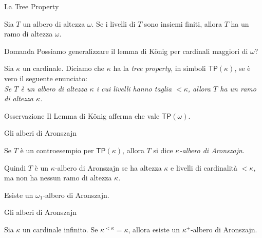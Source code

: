 \documentclass{beamer}
\theoremstyle{num.custom-title}
\theoremstyle{custom-title}
\newcommand{\TP}{\ensuremath{\mathsf{TP}}\xspace}
\begin{document}
\begin{frame}{La Tree Property}

\vspace{5pt}

\begin{lemma}[König]
Sia $T$ un albero di altezza $\omega$. Se i livelli di $T$ sono insiemi finiti, allora $T$ ha un ramo di altezza $\omega$.
\end{lemma}

\begin{exampleblock}{Domanda}
Possiamo generalizzare il lemma di König per cardinali maggiori di $\omega$?
\end{exampleblock}

\pause

\begin{definition}
Sia $\kappa$ un cardinale. Diciamo che $\kappa$ ha la \emph{tree property}, in simboli $\TP(\kappa)$, se è vero il seguente enunciato:\\
\textit{Se $T$ è un albero di altezza $\kappa$ i cui livelli hanno taglia $< \kappa$, allora $T$ ha un ramo di altezza $\kappa$.}
\end{definition}

\pause

\begin{alertblock}{Osservazione}
Il Lemma di König afferma che vale $\TP(\omega)$.
\end{alertblock}

\end{frame}


\begin{frame}{Gli alberi di Aronszajn}

\begin{definition}
Se $T$ è un controesempio per $\TP(\kappa)$, allora $T$ si dice \emph{$\kappa$-albero di Aronszajn}.
\end{definition}
Quindi $T$ è un $\kappa$-albero di Aronszajn se ha altezza $\kappa$ e livelli di cardinalità $< \kappa$, ma non ha nessun ramo di altezza $\kappa$.

\pause

\begin{theorem}[Aronszajn, 1934]
Esiste un $\omega_1$-albero di Aronszajn.
\end{theorem}

\end{frame}

\begin{frame}{Gli alberi di Aronszajn}

\begin{theorem}[Specker, 1949]
Sia $\kappa$ un cardinale infinito. Se $\kappa^{< \kappa} = \kappa$, allora esiste un $\kappa^+$-albero di Aronszajn.
\end{theorem}

\end{frame}
\end{document}
